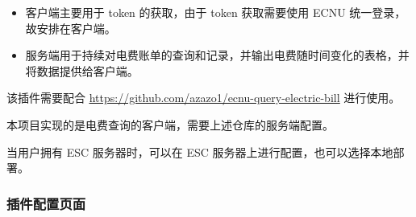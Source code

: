 \documentclass[14pt,a4paper,UTF8,twoside]{article}
\begin{document}
\begin{itemize}
\item 客户端主要用于 token 的获取，由于 token 获取需要使用 ECNU 统一登录，故安排在客户端。
\item 服务端用于持续对电费账单的查询和记录，并输出电费随时间变化的表格，并将数据提供给客户端。
\end{itemize}

\begin{note}
    该插件需要配合 \href{https://github.com/azazo1/ecnu-query-electric-bill}{\underline{https://github.com/azazo1/ecnu-query-electric-bill}} 进行使用。

    本项目实现的是电费查询的客户端，需要上述仓库的服务端配置。

    当用户拥有 ESC 服务器时，可以在 ESC 服务器上进行配置，也可以选择本地部署。
\end{note}

\newpage{}

\subsubsection{插件配置页面}
\end{document}
